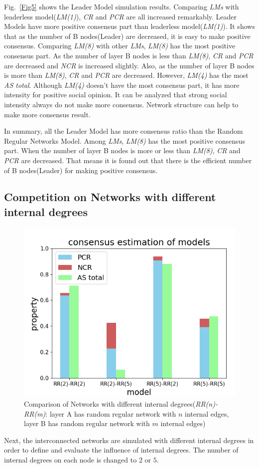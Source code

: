 \documentclass[english]{cccconf}
\begin{document}
Fig.~\ref{Fig5} shows the Leader Model simulation results. Comparing \textit{LMs} with leaderless model(\textit{LM(1)}), \textit{CR} and \textit{PCR} are all increased remarkably. Leader Models have more positive consensus part than leaderless model(\textit{LM(1)}). It shows that as the number of B nodes(Leader) are decreased, it is easy to make positive consensus. Comparing \textit{LM(8)} with other \textit{LMs}, \textit{LM(8)} has the most positive consensus part. As the number of layer B nodes is less than \textit{LM(8)},  \textit{CR} and \textit{PCR} are decreased and \textit{NCR} is increased slightly. Also, as the number of layer B nodes is more than \textit{LM(8)}, \textit{CR} and \textit{PCR} are decreased. However, \textit{LM(4)} has the most \textit{AS total}. Although \textit{LM(4)} doesn't have the most consensus part, it has more intensity for positive social opinion. It can be analyzed that strong social intensity always do not make more consensus. Network structure can help to make more consensus result.    

In summary, all the Leader Model has more consensus ratio than the Random Regular Networks Model. Among \textit{LMs}, \textit{LM(8)} has the most positive consensus part. When the number of layer B nodes is more or less than \textit{LM(8)}, \textit{CR} and \textit{PCR} are decreased. That means it is found out that there is the efficient number of B nodes(Leader) for making positive consensus.  

\subsection{Competition on Networks with different internal degrees}
\begin{figure}[!htb]
	\centering
	\includegraphics[width=\hsize]{FIG6.png}
	\caption{Comparison of Networks with different internal degrees(\textit{RR(n)-RR(m)}: layer A has random regular network with $n$ internal edges, layer B has random regular network with $m$ internal edges)}
	\label{Fig6}
\end{figure}
Next, the interconnected networks are simulated with different internal degrees in order to define and evaluate the influence of internal degrees. The number of internal degrees on each node is changed to $2$ or $5$.
\end{document}
